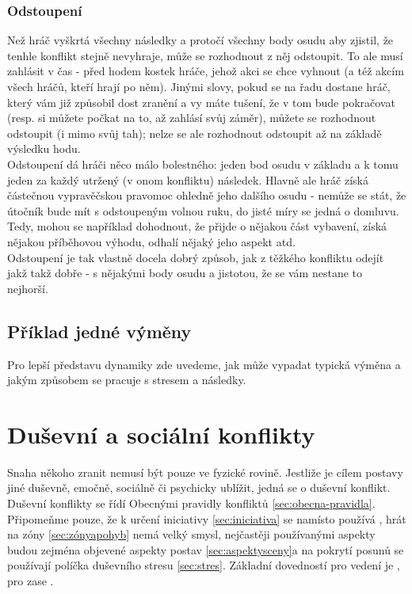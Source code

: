 \documentclass[../main.tex]{subfiles}
\begin{document}
\subsubsection{Odstoupení}
\label{sec:odstoupeni}

Než hráč vyškrtá všechny následky a protočí všechny body osudu aby zjistil, že tenhle konflikt stejně nevyhraje, může se rozhodnout z něj odstoupit. To ale musí zahlásit v čas - před hodem kostek hráče, jehož akci se chce vyhnout (a též akcím všech hráčů, kteří hrají po něm). Jinými slovy, pokud se na řadu dostane hráč, který vám již způsobil dost zranění a vy máte tušení, že v tom bude pokračovat (resp. si můžete počkat na to, až zahlásí svůj záměr), můžete se rozhodnout odstoupit (i mimo svůj tah); nelze se ale rozhodnout odstoupit až na základě výsledku hodu.\\
Odstoupení dá hráči něco málo bolestného: jeden bod osudu v základu a k tomu jeden za každý utržený (v onom konfliktu) následek. Hlavně ale hráč získá částečnou vypravěčskou pravomoc ohledně jeho dalšího osudu - nemůže se stát, že útočník bude mít s odstoupeným volnou ruku, do jisté míry se jedná o domluvu. Tedy, mohou se například dohodnout, že přijde o nějakou část vybavení, získá nějakou příběhovou výhodu, odhalí nějaký jeho aspekt atd. \\
Odstoupení je tak vlastně docela dobrý způsob, jak z těžkého konfliktu odejít jakž takž dobře - s nějakými body osudu a jistotou, že se vám nestane to nejhorší. 

\subsection{Příklad jedné výměny}
\label{sec:priklad-vymena}

Pro lepší představu dynamiky zde uvedeme, jak může vypadat typická výměna a jakým způsobem se pracuje s stresem a následky.

\section{Duševní a sociální konflikty}
\label{sec:dusevni-soc-konflikty}

Snaha někoho zranit nemusí být pouze ve fyzické rovině. Jestliže je cílem postavy jiné duševně, emočně, sociálně či psychicky ublížit, jedná se o duševní konflikt. \\
Duševní konflikty se řídí Obecnými pravidly konfliktů \ref{sec:obecna-pravidla}. Připomeňme pouze, že k určení iniciativy \ref{sec:iniciativa} se namísto  používá , hrát na zóny \ref{sec:zónyapohyb} nemá velký smysl, nejčastěji používanými aspekty budou zejména objevené aspekty postav \ref{sec:aspektysceny}a na pokrytí posunů se používají políčka duševního stresu \ref{sec:stres}. Základní dovedností pro vedení  je , pro  zase .
\end{document}
